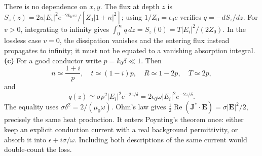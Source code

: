 There is no dependence on $x,y$. The flux at depth $z$ is
$S_z(z)=2u|E_i|^2e^{-2k_0vz}/[Z_0|1+n|^2]$; using
$1/Z_0=\epsilon_0c$ verifies $q=-dS_z/dz$.
For $v>0$, integrating to infinity gives
$\int_0^\infty q\,dz=S_z(0)=T|E_i|^2/(2Z_0)$.
In the lossless case $v=0$, the dissipation vanishes and the entering
flux instead propagates to infinity; it must not be equated to a
vanishing absorption integral.
\textbf{(c)} For a good conductor write $p=k_0\delta\ll1$.
Then
\[
n\simeq\frac{1+i}{p},\quad t\simeq(1-i)p,\quad
R\simeq1-2p,\quad T\simeq2p,
\]
and
\[
\boxed{q(z)\simeq\sigma p^2|E_i|^2e^{-2z/\delta}
                =2\epsilon_0\omega|E_i|^2e^{-2z/\delta}.}
\]
The equality uses $\sigma\delta^2=2/(\mu_0\omega)$.
Ohm's law gives
$\tfrac12\operatorname{Re}(\mathbf J^*\cdot\mathbf E)
=\sigma|\mathbf E|^2/2$, precisely the same heat production.
It enters Poynting's theorem once: either keep an explicit conduction
current with a real background permittivity, or absorb it into
$\epsilon+i\sigma/\omega$. Including both descriptions of the same
current would double-count the loss.


